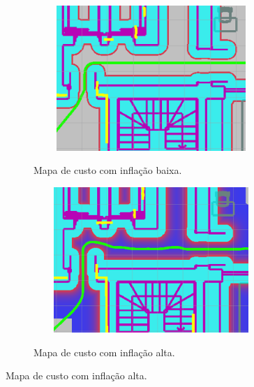 \documentclass[repeatfields,xlists,xpacks,oneside,yearsonly]{ufrgscca}
\begin{document}
\begin{figure}[h]
    \caption{Trajetórias criadas com diferentes configurações da camada de inflação}
    \begin{subfigure}{0.5\linewidth}
        {
            \centering
            \caption{Mapa de custo com inflação baixa.}
            \label{fig:inflation_low}
            \includegraphics[width=0.98\textwidth, height=5.5cm]{costmap_not_inflated.png}\\
        }
    \end{subfigure}
    \begin{subfigure}{0.5\linewidth}
        {
            \centering
            \caption{Mapa de custo com inflação alta.}
            \label{fig:inflation_high}
            \includegraphics[width=0.98\textwidth, height=5.5cm]{costmap_inflated.png}\\
        }
    \end{subfigure}
\end{figure}

\end{document}
